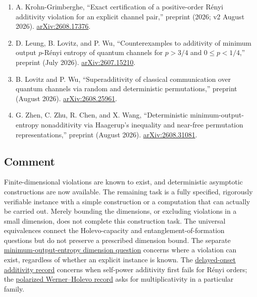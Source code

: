 \begin{enumerate}[label={},leftmargin=4.8em,labelsep=0.5em]
  \item[\textup{[KG26]}]\label{ref:cf-kg26}
  A. Krohn-Grimberghe, ``Exact certification of a positive-order R\'enyi additivity violation for an explicit channel pair,'' preprint (2026; v2 August 2026).
\href{https://arxiv.org/abs/2608.17376}{arXiv:2608.17376}.

  \item[\textup{[LLW26]}]\label{ref:cf-llw26}
  D. Leung, B. Lovitz, and P. Wu, ``Counterexamples to additivity of minimum output $p$-R\'enyi entropy of quantum channels for $p>3/4$ and $0\le p<1/4$,'' preprint (July 2026).
\href{https://arxiv.org/abs/2607.15210}{arXiv:2607.15210}.

  \item[\textup{[LovWu26]}]\label{ref:cf-lovwu26}
  B. Lovitz and P. Wu, ``Superadditivity of classical communication over quantum channels via random and deterministic permutations,'' preprint (August 2026).
\href{https://arxiv.org/abs/2608.25961}{arXiv:2608.25961}.

  \item[\textup{[ZZCW26]}]\label{ref:cf-zzcw26}
  G. Zhen, C. Zhu, R. Chen, and X. Wang, ``Deterministic minimum-output-entropy nonadditivity via Haagerup's inequality and near-free permutation representations,'' preprint (August 2026).
\href{https://arxiv.org/abs/2608.31081}{arXiv:2608.31081}.
\end{enumerate}

\subsection*{Comment}

Finite-dimensional violations are known to exist, and deterministic asymptotic constructions are now available. The remaining task is a fully specified, rigorously verifiable instance with a simple construction or a computation that can actually be carried out. Merely bounding the dimensions, or excluding violations in a small dimension, does not complete this construction task. The universal equivalences connect the Holevo-capacity and entanglement-of-formation questions but do not preserve a prescribed dimension bound. The separate \href{https://qiqc-op.com/problem/op_e724615844c52297/}{minimum-output-entropy dimension question} concerns where a violation can exist, regardless of whether an explicit instance is known. The \href{https://qiqc-op.com/problem/op_c0b1045a614d2353/}{delayed-onset additivity record} concerns when self-power additivity first fails for R\'enyi orders; the \href{https://qiqc-op.com/problem/op_ad05396ff490713c/}{polarized Werner--Holevo record} asks for multiplicativity in a particular family.

